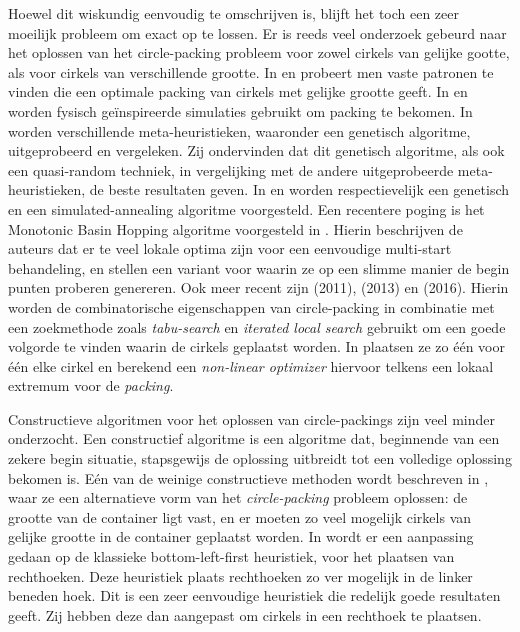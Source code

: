 \documentclass[12pt,a4paper,oneside]{book}
\begin{document}
Hoewel dit wiskundig eenvoudig te omschrijven is, blijft het toch een zeer moeilijk probleem om exact op te lossen.
Er is reeds veel onderzoek gebeurd naar het oplossen van het circle-packing probleem voor zowel cirkels van gelijke gootte, als voor cirkels van verschillende grootte.
In \cite{graham1996repeated} en \cite{lubachevsky1997curved} probeert men vaste patronen te vinden die een optimale packing van cirkels met gelijke grootte geeft.
In \cite{graham1998dense} en \cite{wang2002improved} worden fysisch geïnspireerde simulaties gebruikt om packing te bekomen.
In \cite{george1995packing} worden verschillende meta-heuristieken, waaronder een genetisch algoritme, uitgeprobeerd en vergeleken.
Zij ondervinden dat dit genetisch algoritme, als ook een quasi-random techniek, in vergelijking met de andere uitgeprobeerde meta-heuristieken, de beste resultaten geven.
In \cite{hifi2004approximate} en \cite{hifi2004simulated} worden respectievelijk een genetisch en een simulated-annealing algoritme voorgesteld.
Een recentere poging is het Monotonic Basin Hopping algoritme voorgesteld in \cite{grosso2010}.
Hierin beschrijven de auteurs dat er te veel lokale optima zijn voor een eenvoudige multi-start behandeling, en stellen een variant voor waarin ze op een slimme manier de begin punten proberen genereren.
Ook meer recent zijn \cite{jors2011} (2011), \cite{ye2013iterated} (2013) en \cite{zeng2016iterated} (2016).
Hierin worden de combinatorische eigenschappen van circle-packing in combinatie met een zoekmethode zoals \textit{tabu-search} en \textit{iterated local search} gebruikt om een goede volgorde te vinden waarin de cirkels geplaatst worden.
In \cite{jors2011} plaatsen ze zo één voor één elke cirkel en berekend een \textit{non-linear optimizer} hiervoor telkens een lokaal extremum voor de \textit{packing}.

Constructieve algoritmen voor het oplossen van circle-packings zijn veel minder onderzocht.
Een constructief algoritme is een algoritme dat, beginnende van een zekere begin situatie, stapsgewijs de oplossing uitbreidt tot een volledige oplossing bekomen is.
Eén van de weinige constructieve methoden wordt beschreven in \cite{akeb2006basic}, waar ze een alternatieve vorm van het \textit{circle-packing} probleem oplossen: de grootte van de container ligt vast, en er moeten zo veel mogelijk cirkels van gelijke grootte in de container geplaatst worden.
In \cite{hifi2004approximate} wordt er een aanpassing gedaan op de klassieke bottom-left-first heuristiek, voor het plaatsen van rechthoeken.
Deze heuristiek plaats rechthoeken zo ver mogelijk in de linker beneden hoek.
Dit is een zeer eenvoudige heuristiek die redelijk goede resultaten geeft.
Zij hebben deze dan aangepast om cirkels in een rechthoek te plaatsen.
\end{document}
